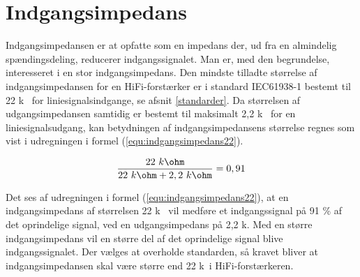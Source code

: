 \section{Indgangsimpedans}
\label{valg_indgangsimpedans}
Indgangsimpedansen er at opfatte som en impedans der, ud fra en almindelig spændingsdeling, reducerer indgangssignalet. Man er, med den begrundelse, interesseret i en stor indgangsimpedans. Den mindste tilladte størrelse af indgangsimpedansen for en HiFi-forstærker er i standard IEC61938-1 bestemt til 22 k\ohm~ for liniesignalsindgange, se afsnit \ref{standarder}. Da størrelsen af udgangsimpedansen samtidig er bestemt til maksimalt 2,2 k\ohm~ for en liniesignalsudgang, kan betydningen af indgangsimpedansens størrelse regnes som vist i udregningen i formel (\ref{equ:indgangsimpedans22}). 

\begin{equation}
\label{equ:indgangsimpedans22}
\frac{22~k\ohm}{22~k\ohm + 2,2~k\ohm} = 0,91
\end{equation}

Det ses af udregningen i formel (\ref{equ:indgangsimpedans22}), at en indgangsimpedans af størrelsen 22 k\ohm~ vil medføre et indgangssignal på 91 \% af det oprindelige signal, ved en udgangsimpedans på 2,2 k\ohm. Med en større indgangsimpedans vil en større del af det oprindelige signal blive indgangssignalet. Der vælges at overholde standarden, så kravet bliver at indgangsimpedansen skal være større end 22 k\ohm~i HiFi-forstærkeren.
